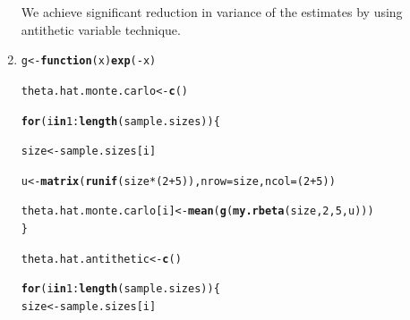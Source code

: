\documentclass[11pt, a4paper]{article}\usepackage[]{graphicx}\usepackage[]{xcolor}
\makeatletter
\newcommand{\hlnum}[1]{\textcolor[rgb]{0.686,0.059,0.569}{#1}}%
\newcommand{\hlopt}[1]{\textcolor[rgb]{0,0,0}{#1}}%
\newcommand{\hldef}[1]{\textcolor[rgb]{0.345,0.345,0.345}{#1}}%
\newcommand{\hlkwa}[1]{\textcolor[rgb]{0.161,0.373,0.58}{\textbf{#1}}}%
\newcommand{\hlkwb}[1]{\textcolor[rgb]{0.69,0.353,0.396}{#1}}%
\newcommand{\hlkwc}[1]{\textcolor[rgb]{0.333,0.667,0.333}{#1}}%
\newcommand{\hlkwd}[1]{\textcolor[rgb]{0.737,0.353,0.396}{\textbf{#1}}}%
\newenvironment{kframe}{%
 \def\at@end@of@kframe{}%
 \ifinner\ifhmode%
  \def\at@end@of@kframe{\end{minipage}}%
  \begin{minipage}{\columnwidth}%
 \fi\fi%
 \def\FrameCommand##1{\hskip\@totalleftmargin \hskip-\fboxsep
 \colorbox{shadecolor}{##1}\hskip-\fboxsep
     \hskip-\linewidth \hskip-\@totalleftmargin \hskip\columnwidth}%
 \MakeFramed {\advance\hsize-\width
   \@totalleftmargin\z@ \linewidth\hsize
   \@setminipage}}%
 {\par\unskip\endMakeFramed%
 \at@end@of@kframe}
\newenvironment{knitrout}{}{} %
\makeatother
\begin{document}
\begin{enumerate}
{\fontsize{25}{20} } \hspace{0.1cm} {\fontsize{12}{20}\gloriahallelujahfont We achieve significant reduction in variance of the estimates by using antithetic variable technique.}

\item[\scalebox{2.0}{\twemoji{keycap: 2}}]

\begin{knitrout}
\color{fgcolor}\begin{kframe}
\begin{alltt}
\hldef{g} \hlkwb{<-} \hlkwa{function}\hldef{(}\hlkwc{x}\hldef{)} \hlkwd{exp}\hldef{(}\hlopt{-}\hldef{x)}
\end{alltt}
\end{kframe}
\end{knitrout}

\begin{knitrout}
\color{fgcolor}\begin{kframe}
\begin{alltt}
\hldef{theta.hat.monte.carlo} \hlkwb{<-} \hlkwd{c}\hldef{()}

\hlkwa{for} \hldef{(i} \hlkwa{in} \hlnum{1}\hlopt{:}\hlkwd{length}\hldef{(sample.sizes)) \{}

  \hldef{size} \hlkwb{<-} \hldef{sample.sizes[i]}

  \hldef{u} \hlkwb{<-} \hlkwd{matrix}\hldef{(}\hlkwd{runif}\hldef{(size} \hlopt{*} \hldef{(}\hlnum{2} \hlopt{+} \hlnum{5}\hldef{)),} \hlkwc{nrow} \hldef{= size,} \hlkwc{ncol} \hldef{= (}\hlnum{2} \hlopt{+} \hlnum{5}\hldef{))}

  \hldef{theta.hat.monte.carlo[i]} \hlkwb{<-} \hlkwd{mean}\hldef{(}\hlkwd{g}\hldef{(}\hlkwd{my.rbeta}\hldef{(size,} \hlnum{2}\hldef{,} \hlnum{5}\hldef{, u)))}
\hldef{\}}
\end{alltt}
\end{kframe}
\end{knitrout}

\begin{knitrout}
\color{fgcolor}\begin{kframe}
\begin{alltt}
\hldef{theta.hat.antithetic} \hlkwb{<-} \hlkwd{c}\hldef{()}

\hlkwa{for} \hldef{(i} \hlkwa{in} \hlnum{1}\hlopt{:}\hlkwd{length}\hldef{(sample.sizes)) \{}
  \hldef{size} \hlkwb{<-} \hldef{sample.sizes[i]}


\end{alltt}
\end{kframe}
\end{knitrout}
\end{enumerate}
\end{document}
